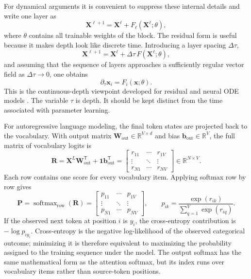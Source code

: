 \documentclass[11pt]{article}
\begin{document}
For dynamical arguments it is convenient to suppress these internal details and write one layer as
\begin{equation}
\mathbf X^{\ell+1}
=
\mathbf X^\ell
+
F_\ell(\mathbf X^\ell;\theta),
\label{eq:residual}
\end{equation}
where $\theta$ contains all trainable weights of the block. The residual form is useful because it makes depth look like discrete time. Introducing a layer spacing $\Delta\tau$,
\begin{equation}
\mathbf X^{\ell+1}
=
\mathbf X^\ell
+
\Delta\tau\,
F(\mathbf X^\ell;\theta),
\end{equation}
and assuming that the sequence of layers approaches a sufficiently regular vector field as $\Delta\tau\to0$, one obtains
\begin{equation}
\partial_\tau\mathbf x_i
=
F_i(\mathbf x;\theta).
\label{eq:depth-flow}
\end{equation}
This is the continuous-depth viewpoint developed for residual and neural ODE models \cite{he2016resnet,chen2018neuralode}. The variable $\tau$ is depth. It should be kept distinct from the time associated with parameter learning.

For autoregressive language modeling, the final token states are projected back to the vocabulary. With output matrix $\mathbf W_{\mathrm{out}}\in\mathbb R^{V\times d}$ and bias $\mathbf b_{\mathrm{out}}\in\mathbb R^V$, the full matrix of vocabulary logits is
\begin{equation}
\mathbf R
=
\mathbf X^L\mathbf W_{\mathrm{out}}^{\mathsf T}
+
\mathbf 1\mathbf b_{\mathrm{out}}^{\mathsf T}
=
\begin{bmatrix}
r_{11} & \cdots & r_{1V}\\
\vdots & \ddots & \vdots\\
r_{N1} & \cdots & r_{NV}
\end{bmatrix}
\in\mathbb R^{N\times V}.
\label{eq:vocabulary-logits}
\end{equation}
Each row contains one score for every vocabulary item. Applying softmax row by row gives
\begin{equation}
\mathbf P
=
\operatorname{softmax}_{\mathrm{row}}(\mathbf R)
=
\begin{bmatrix}
p_{11} & \cdots & p_{1V}\\
\vdots & \ddots & \vdots\\
p_{N1} & \cdots & p_{NV}
\end{bmatrix},
\qquad
p_{ik}
=
\frac{\exp(r_{ik})}{\sum_{q=1}^{V}\exp(r_{iq})}.
\label{eq:vocabulary-probabilities}
\end{equation}
If the observed next token at position $i$ is $y_i$, the cross-entropy contribution is $-\log p_{i y_i}$. Cross-entropy is the negative log-likelihood of the observed categorical outcome; minimizing it is therefore equivalent to maximizing the probability assigned to the training sequence under the model. The output softmax has the same mathematical form as the attention softmax, but its index runs over vocabulary items rather than source-token positions.
\end{document}

